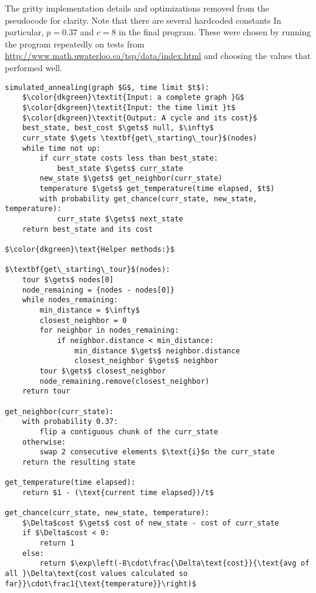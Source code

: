 \documentclass[11pt,letterpaper]{article}
\begin{document}
The gritty implementation details and optimizations removed from the pseudocode for clarity. Note that there are several hardcoded constants In particular, $p=0.37$ and $c=8$ in the final program. These were chosen by running the program repeatedly on tests from \url{http://www.math.uwaterloo.ca/tsp/data/index.html} and choosing the values that performed well.
\begin{lstlisting}
simulated_annealing(graph $G$, time limit $t$):
	$\color{dkgreen}\textit{Input: a complete graph }G$
	$\color{dkgreen}\textit{Input: the time limit }t$
	$\color{dkgreen}\textit{Output: A cycle and its cost}$
	best_state, best_cost $\gets$ null, $\infty$
	curr_state $\gets \textbf{get\_starting\_tour}$(nodes)
	while time not up:
		if curr_state costs less than best_state:
			best_state $\gets$ curr_state
		new_state $\gets$ get_neighbor(curr_state)
		temperature $\gets$ get_temperature(time elapsed, $t$)
		with probability get_chance(curr_state, new_state, temperature):
			curr_state $\gets$ next_state
	return best_state and its cost

$\color{dkgreen}\text{Helper methods:}$

$\textbf{get\_starting\_tour}$(nodes):
    tour $\gets$ nodes[0]
    node_remaining = {nodes - nodes[0]}
    while nodes_remaining:
        min_distance = $\infty$
        closest_neighbor = 0
        for neighbor in nodes_remaining:
            if neighbor.distance < min_distance:
                min_distance $\gets$ neighbor.distance
                closest_neighbor $\gets$ neighbor
        tour $\gets$ closest_neighbor
        node_remaining.remove(closest_neighbor)
    return tour

get_neighbor(curr_state):
	with probability 0.37:
		flip a contiguous chunk of the curr_state
	otherwise:
		swap 2 consecutive elements $\text{i}$n the curr_state
	return the resulting state

get_temperature(time elapsed):
	return $1 - (\text{current time elapsed})/t$

get_chance(curr_state, new_state, temperature):
	$\Delta$cost $\gets$ cost of new_state - cost of curr_state
	if $\Delta$cost < 0:
		return 1
	else:
		return $\exp\left(-8\cdot\frac{\Delta\text{cost}}{\text{avg of all }\Delta\text{cost values calculated so far}}\cdot\frac1{\text{temperature}}\right)$

\end{lstlisting}
\end{document}
